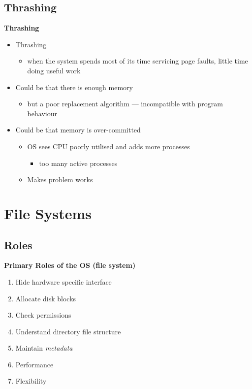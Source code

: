 \documentclass[11pt,a4paper]{article}
\begin{document}
\subsection{Thrashing}

\textbf{Thrashing}
\begin{itemize}
    \item Thrashing
        \begin{itemize}
            \item when the system spends most of its time servicing page faults, little time
                doing useful work
        \end{itemize}
    \item Could be that there is enough memory
        \begin{itemize}
            \item but a poor replacement algorithm --- incompatible with program behaviour
        \end{itemize}
    \item Could be that memory is over-committed
        \begin{itemize}
            \item OS sees CPU poorly utilised and adds more processes
                \begin{itemize}
                    \item too many active processes
                \end{itemize}
            \item Makes problem works
        \end{itemize}
\end{itemize}

\break{}

\section{File Systems}

\subsection{Roles}

\textbf{Primary Roles of the OS (file system)}
\begin{enumerate}
    \item Hide hardware specific interface
    \item Allocate disk blocks
    \item Check permissions
    \item Understand directory file structure
    \item Maintain \emph{metadata}
    \item Performance
    \item Flexibility
\end{enumerate}
\end{document}
